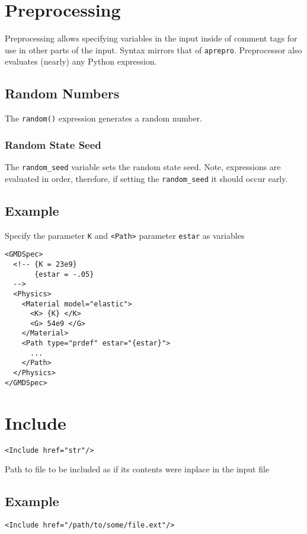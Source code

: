 \documentclass[11pt]{report}
\renewcommand{\tag}[1]{\texttt{<#1>}}
\newcommand{\reqdtag}[1]{\Red{\texttt{<#1>}}}
\begin{document}
\section{Preprocessing}
Preprocessing allows specifying variables in the input inside of comment tags
for use in other parts of the input. Syntax mirrors that of \texttt{aprepro}.
Preprocessor also evaluates (nearly) any Python expression.

\subsection{Random Numbers}
The \texttt{random()} expression generates a random number.

\subsubsection{Random State Seed}
The \verb:random_seed: variable sets the random state seed.  Note, expressions
are evaluated in order, therefore, if setting the \verb:random_seed: it should
occur early.

\subsection{Example}
Specify the \reqdtag{Material} parameter \texttt{K} and \tag{Path} parameter
\texttt{estar} as variables
\begin{verbatim}
<GMDSpec>
  <!-- {K = 23e9}
       {estar = -.05}
  -->
  <Physics>
    <Material model="elastic">
      <K> {K} </K>
      <G> 54e9 </G>
    </Material>
    <Path type="prdef" estar="{estar}">
      ...
    </Path>
  </Physics>
</GMDSpec>
\end{verbatim}

\section{Include}
\begin{verbatim}
<Include href="str"/>
\end{verbatim}
%
Path to file to be included as if its contents were inplace in the input file

\subsection{Example}
\begin{verbatim}
<Include href="/path/to/some/file.ext"/>
\end{verbatim}
\end{document}
